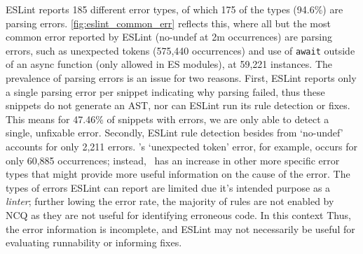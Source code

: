\documentclass[conference]{IEEEtran}
\begin{document}
ESLint reports 185 different error types, of which 175 of the types (94.6\%) are parsing errors. \autoref{fig:eslint_common_err} reflects this, where all but the most common error reported by ESLint (no-undef at 2m occurrences) are parsing errors, such as unexpected tokens (575,440 occurrences) and use of \texttt{await} outside of an async function (only allowed in ES modules), at 59,221 instances. The prevalence of parsing errors is an issue for two reasons. First, ESLint reports only a single parsing error per snippet indicating why parsing failed, thus these snippets do not generate an AST, nor can ESLint run its rule detection or fixes. This means for 47.46\% of snippets with errors, we are only able to detect a single, unfixable error. Secondly, ESLint rule detection besides from `no-undef' accounts for only 2,211 errors. \ts{}'s `unexpected token' error, for example, occurs for only 60,885 occurrences; instead, \ts\ has an increase in other more specific error types that might provide more useful information on the cause of the error. The types of errors ESLint can report are limited due it's intended purpose as a \emph{linter}; further lowing the error rate, the majority of rules are not enabled by NCQ as they are not useful for identifying erroneous code. In this context Thus, the error information is incomplete, and ESLint may not necessarily be useful for evaluating runnability or informing fixes.

\vspace{0.5cm}
\vspace{1em}


\end{document}

